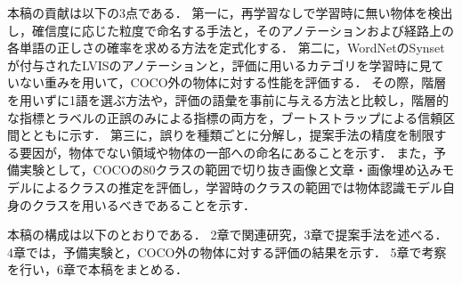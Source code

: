 本稿の貢献は以下の3点である．
第一に，再学習なしで学習時に無い物体を検出し，確信度に応じた粒度で命名する手法と，そのアノテーションおよび経路上の各単語の正しさの確率を求める方法を定式化する．
第二に，WordNetのSynsetが付与されたLVISのアノテーションと，評価に用いるカテゴリを学習時に見ていない重みを用いて，COCO外の物体に対する性能を評価する．
その際，階層を用いずに1語を選ぶ方法や，評価の語彙を事前に与える方法と比較し，階層的な指標とラベルの正誤のみによる指標の両方を，ブートストラップによる信頼区間とともに示す．
第三に，誤りを種類ごとに分解し，提案手法の精度を制限する要因が，物体でない領域や物体の一部への命名にあることを示す．
また，予備実験として，COCOの80クラスの範囲で切り抜き画像と文章・画像埋め込みモデルによるクラスの推定を評価し，学習時のクラスの範囲では物体認識モデル自身のクラスを用いるべきであることを示す．

本稿の構成は以下のとおりである．
2章で関連研究，3章で提案手法を述べる．
4章では，予備実験と，COCO外の物体に対する評価の結果を示す．
5章で考察を行い，6章で本稿をまとめる．
